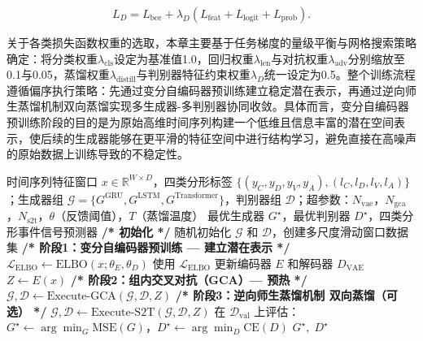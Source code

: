 \begin{equation}
L_D
=
L_{\text{bce}}
+
\lambda_D\left(
L_{\text{feat}}
+
L_{\text{logit}}
+
L_{\text{prob}}
\right).
\end{equation}

关于各类损失函数权重的选取，本章主要基于任务梯度的量级平衡与网格搜索策略确定：将分类权重$\lambda_{\text{cls}}$设定为基准值1.0，回归权重$\lambda_{\text{len}}$与对抗权重$\lambda_{\text{adv}}$分别缩放至0.1与0.05，蒸馏权重$\lambda_{\text{distill}}$与判别器特征约束权重$\lambda_D$统一设定为0.5。整个训练流程遵循偏序执行策略：先通过变分自编码器预训练建立稳定潜在表示，再通过逆向师生蒸馏机制双向蒸馏实现多生成器-多判别器协同收敛。具体而言，变分自编码器预训练阶段的目的是为原始高维时间序列构建一个低维且信息丰富的潜在空间表示，使后续的生成器能够在更平滑的特征空间中进行结构学习，避免直接在高噪声的原始数据上训练导致的不稳定性。

\begin{algorithm}[H]
\caption{四类分形结构预测框架总体训练流程}
\label{alg:cdva_overall}
\begin{algorithmic}[0]
\Require 时间序列特征窗口 $x \in \mathbb{R}^{W \times D}$，四类分形标签 $\{(y_C, y_D, y_V, y_A), (l_C, l_D, l_V, l_A)\}$；生成器组 $\mathcal{G} = \{G^{\text{GRU}}, G^{\text{LSTM}}, G^{\text{Transformer}}\}$，判别器组 $\mathcal{D}$；超参数：$N_{\text{vae}}$，$N_{\text{gca}}$，$N_{\text{s2t}}$，$\theta$（反馈阈值），$T$（蒸馏温度）
\Ensure 最优生成器 $G^{\star}$，最优判别器 $D^{\star}$，四类分形事件信号预测器
\Statex
\State \textbf{/* 初始化 */} 随机初始化 $\mathcal{G}$ 和 $\mathcal{D}$，创建多尺度滑动窗口数据集
\Statex
\State \textbf{/* 阶段1：变分自编码器预训练 — 建立潜在表示 */}
    \State $\mathcal{L}_{\text{ELBO}} \leftarrow \text{ELBO}(x; \theta_E, \theta_D)$
    \State 使用 $\mathcal{L}_{\text{ELBO}}$ 更新编码器 $E$ 和解码器 $D_{\text{VAE}}$
\EndFor
\State $Z \leftarrow E(x)$ 
\Statex
\State \textbf{/* 阶段2：组内交叉对抗（GCA）— 预热 */}
\State $\mathcal{G}, \mathcal{D} \leftarrow \text{Execute-GCA}(\mathcal{G}, \mathcal{D}, Z)$ 
\Statex
\State \textbf{/* 阶段3：逆向师生蒸馏机制 双向蒸馏（可选） */}
    \State $\mathcal{G}, \mathcal{D} \leftarrow \text{Execute-S2T}(\mathcal{G}, \mathcal{D}, Z)$ 
\EndIf
\Statex
\State 在 $\mathcal{D}_{\text{val}}$ 上评估：$G^{\star} \leftarrow \arg\min_G \text{MSE}(G)$，$D^{\star} \leftarrow \arg\min_D \text{CE}(D)$
\State \Return $G^{\star},\; D^{\star}$
\end{algorithmic}
\end{algorithm}

